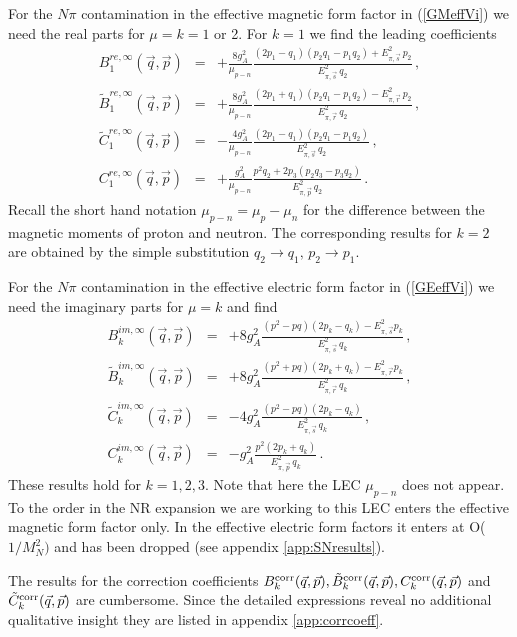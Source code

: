\documentclass[11pt,prd,aps,showpacs,eqsecnum,floatfix,nofootinbib,preprint,tightenlines]{revtex4}
\newcommand{\pref}[1]{(\ref{#1})}
\newcommand{\Epip}{E_{\pi, \vec{p}}}
\newcommand{\Epir}{E_{\pi,{\vec{r}}}}
\newcommand{\Epis}{E_{\pi,{\vec{s}}}}
\begin{document}
For the $N\pi$ contamination in the effective magnetic form factor in \pref{GMeffVi} we need the real parts for $\mu=k=1$ or 2. For $k=1$ we find the leading coefficients
\begin{eqnarray}
B_1^{re,\infty}(\vec{q},\vec{p}) & =&+ \frac{8 g_A^2}{\mu_{p-n}} \frac{(2p_1-q_1) (p_2q_1-p_1 q_2)+\Epis^2\, p_2}{\Epis^2\, q_2}\,,\label{BkReInf}\\
\tilde{B}_1^{re,\infty}(\vec{q},\vec{p}) & =&+ \frac{8 g_A^2}{\mu_{p-n}} \frac{(2 p_1 + q_1) (p_2 q_1 - p_1 q_2)-\Epir^2\, p_2}{\Epir^2 \,q_2}\,,\label{BtkReInf}\\
\tilde{C}_1^{re,\infty}(\vec{q},\vec{p}) & =&-\frac{4 g_A^2}{\mu_{p-n}} \frac{(2 p_1 - q_1) (p_2 q_1 - p_1 q_2)}{\Epis^2 \,q_2}\,,\\
{C}_1^{re,\infty}(\vec{q},\vec{p}) &=& +\frac{g_A^2}{\mu_{p-n}} \frac{{p}^{2} q_2 + 2p_3( p_2 q_3-p_3 q_2)}{\Epip^2 \, q_2}\,.
\end{eqnarray}
Recall the short hand notation  $\mu_{p-n}=\mu_p-\mu_n$ for the difference between the magnetic moments of proton and neutron.  The corresponding results for $k=2$ are obtained by the simple substitution $q_2\rightarrow q_1, \, p_2 \rightarrow p_1$.

For the $N\pi$ contamination in the effective electric form factor in \pref{GEeffVi} we need the imaginary parts for $\mu=k$ and find 
\begin{eqnarray}
B_k^{im,\infty}(\vec{q},\vec{p}) & =&+ 8 g_A^2 \frac{({p}^{2}-{p}{q}) (2p_k - q_k)-\Epis^2 p_k}{\Epis^2\, q_k}\,,\label{BkimInf}\\
\tilde{B}_k^{im,\infty}(\vec{q},\vec{p}) & =& +8 g_A^2  \frac{({p}^{2}+{p}{q})(2p_k+q_k)-\Epir^2 p_k}{\Epir^2 \,q_k}\,,\label{BtkimInf}\\
\tilde{C}_k^{im,\infty}(\vec{q},\vec{p}) & =&- 4 g_A^2  \frac{({p}^{2}-{p}{q})(2p_k-q_k)}{\Epis^2 \,q_k}\,,\label{CtkimInf}\\
C_k^{im,\infty}(\vec{q},\vec{p}) & =&  - g_A^2  \frac{{p}^2(2 p_k + q_k)}{\Epip^2 \,q_k}\,.\label{CkimInf}
\end{eqnarray}
These results hold for $k=1,2,3$. Note that here the LEC $\mu_{p-n}$ does not appear. To the order in the NR expansion we are working to this LEC enters the effective magnetic form factor only. In the effective electric form factors it enters at O($1/M_N^2)$ and has been dropped (see appendix \ref{app:SNresults}).

The results for the correction coefficients $B_{k}^{\rm corr}(\vec{q},\vec{p}),\tilde{B}_{k}^{\rm corr}(\vec{q},\vec{p}),C_{k}^{\rm corr}(\vec{q},\vec{p})$ and $\tilde{C}_{k}^{\rm corr}(\vec{q},\vec{p})$ are cumbersome. Since the detailed expressions reveal no additional qualitative insight they are listed in appendix \ref{app:corrcoeff}. 
\end{document}
